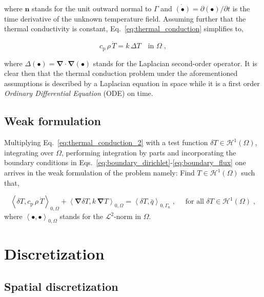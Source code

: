 \documentclass[10pt,a4paper]{article}
\begin{document}
where $\mathbf{n}$ stands for the unit outward normal to $\Gamma$ and $\dot{(\bullet)} = \partial (\bullet)/\partial t$ is the time derivative of the unknown temperature field. Assuming further that the thermal conductivity is constant, Eq.~\eqref{eq:thermal_conduction} simplifies to,

\begin{equation}
	c_{\text{p}} \, \rho \, \dot{T} = k \, \Delta T \quad \text{in }\Omega\;, \label{eq:thermal_conduction_2} 
\end{equation}

where $\Delta(\bullet) = \boldsymbol{\nabla} \cdot \boldsymbol{\nabla} (\bullet)$ stands for the Laplacian second-order operator. It is clear then that the thermal conduction problem under the aforementioned assumptions is described by a Laplacian equation in space while it is a first order \textit{Ordinary Differential Equation} (ODE) on time.

\subsection{Weak formulation}\label{subsec:weak_formulation}

Multiplying Eq.~\eqref{eq:thermal_conduction_2} with a test function $\delta T \in \mathcal{H}^1(\Omega)$, integrating over $\Omega$, performing integration by parts and incorporating the boundary conditions in Eqs.~\eqref{eq:boundary_dirichlet}-\eqref{eq:boundary_flux} one arrives in the weak formulation of the problem namely: Find $T \in \mathcal{H}^1(\Omega)$ such that,

\begin{equation}
	\left< \delta T , c_{\text{p}} \, \rho \, \dot{T} \right>_{0,\Omega} + \left< \boldsymbol{\nabla} \delta T , k \, \boldsymbol{\nabla} T \right>_{0,\Omega} = \left< \delta T , \bar{q} \right>_{0, \Gamma_{\text{n}}} \;, \quad \text{ for all } \delta T \in \mathcal{H}^1(\Omega) \;, \label{eq:thermal_conduction_weak_form} 
\end{equation}
where $\left< \bullet , \bullet \right>_{0,\Omega}$ stands for the $\mathcal{L}^2$-norm in $\Omega$.

\section{Discretization}\label{sec:discretization}

\subsection{Spatial discretization}\label{subsec:spatial_discretization}
\end{document}
